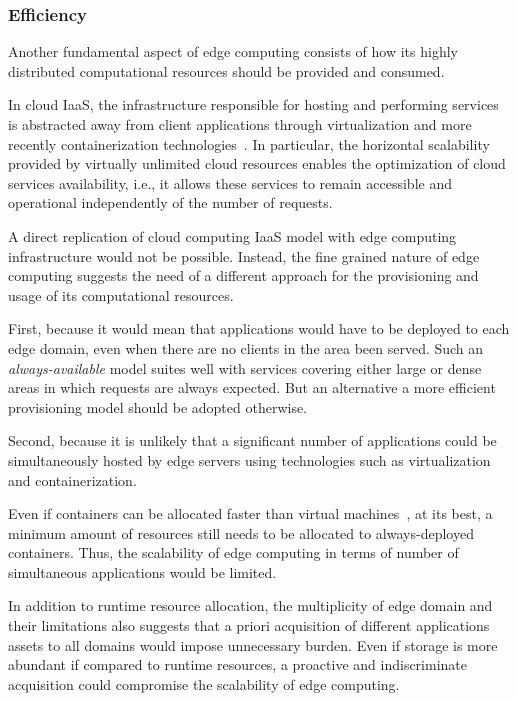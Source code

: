 \subsubsection{Efficiency}

Another fundamental aspect of edge computing consists of how its highly distributed computational resources should be provided and consumed.

In cloud IaaS, the infrastructure responsible for hosting and performing services is abstracted away from client applications through virtualization and more recently containerization technologies~\cite{}. In particular, the horizontal scalability provided by virtually unlimited cloud resources enables the optimization of cloud services availability, i.e., it allows these services to remain accessible and operational independently of the number of requests.




A direct replication of cloud computing IaaS model with edge computing infrastructure would not be possible. Instead, the fine grained nature of edge computing suggests the need of a different approach for the provisioning and usage of its computational resources. 

First, because it would mean that applications would have to be deployed to each edge domain, even when there are no clients in the area been served. Such an \textit{always-available} model suites well with services covering either large or dense areas in which requests are always expected. But an alternative a more efficient provisioning model should be adopted otherwise.

Second, because it is unlikely that a significant number of applications could be simultaneously hosted by edge servers using technologies such as virtualization and containerization. 

Even if containers can be allocated faster than virtual machines~\cite{Giovanni?}, at its best, a minimum amount of resources still needs to be allocated to always-deployed containers. Thus, the scalability of edge computing in terms of number of simultaneous applications would be limited. 
	
In addition to runtime resource allocation, the multiplicity of edge domain and their limitations also suggests that a priori acquisition of different applications assets to all domains would impose unnecessary burden. Even if storage is more abundant if compared to runtime resources, a proactive and indiscriminate acquisition could compromise the scalability of edge computing.

